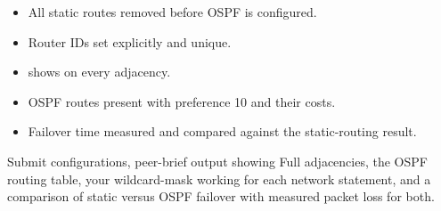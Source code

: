 \begin{verification}
\begin{itemize}
  \item All static routes removed before OSPF is configured.
  \item Router IDs set explicitly and unique.
  \item {} shows  on every adjacency.
  \item OSPF routes present with preference 10 and their costs.
  \item Failover time measured and compared against the static-routing result.
\end{itemize}
\end{verification}

\begin{labdeliverable}
Submit configurations, peer-brief output showing Full adjacencies, the OSPF routing table, your wildcard-mask working for each network statement, and a comparison of static versus OSPF failover with measured packet loss for both.
\end{labdeliverable}
